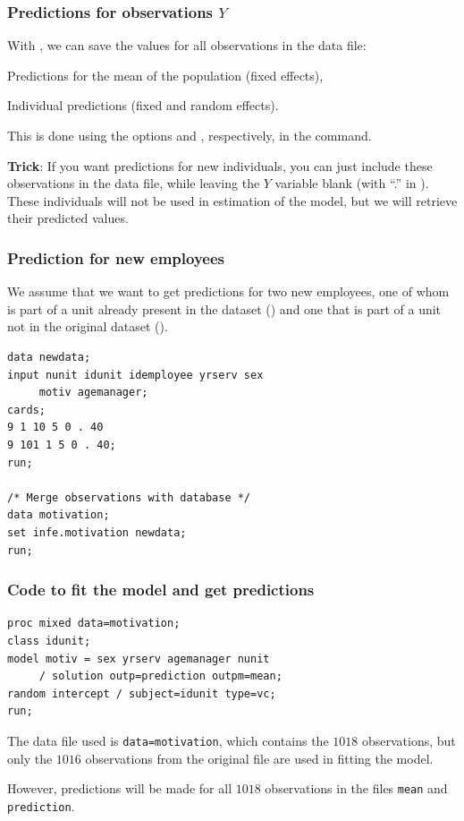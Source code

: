 \documentclass{beamer}
\begin{document}
\begin{frame}[fragile]
\frametitle{Predictions for observations $Y$}
\bi
\item With , we can save the values \alert{for all observations in the data file}:
\bi
\item Predictions for the mean of the population (fixed effects),
\item Individual predictions (fixed and random effects).
\ei
\item This is done using the options 
and , respectively, in the  command.
\item \textbf{Trick}: If you want predictions for new individuals, you can just include these observations in the data file, while leaving the $Y$ variable blank (with ``.'' in \SASlang{}). These individuals will not be used in estimation of the model, but we will retrieve their predicted values.
\ei
\end{frame}

\begin{frame}[fragile]
\frametitle{Prediction for new employees}
We assume that we want to get predictions for two new employees, one of whom is part of a unit already present in the dataset () and one that is part of a unit not in the original dataset (). 


\begin{tcolorbox}[colback=white, colframe=hecblue, title=\SASlang{} code to input two new observations]
\begin{small}
\begin{verbatim}
data newdata; 
input nunit idunit idemployee yrserv sex 
     motiv agemanager; 
cards; 
9 1 10 5 0 . 40 
9 101 1 5 0 . 40; 
run; 

/* Merge observations with database */
data motivation; 
set infe.motivation newdata; 
run;
\end{verbatim}
\end{small}
\end{tcolorbox}
\end{frame}

\begin{frame}[fragile]
\frametitle{Code to fit the model and get predictions}
\begin{tcolorbox}[colback=white, colframe=hecblue, title=\SASlang{} code to output predictions from a mixed model]
\begin{verbatim}
proc mixed data=motivation; 
class idunit; 
model motiv = sex yrserv agemanager nunit 
     / solution outp=prediction outpm=mean; 
random intercept / subject=idunit type=vc; 
run;
\end{verbatim}
\end{tcolorbox}
\bi
\item The data file used is \texttt{data=motivation}, which contains the $1018$ observations, but only the $1016$ observations from the original file are used in fitting the model. 
\item However, predictions will be made for all $1018$ observations in the files \texttt{mean} and \texttt{prediction}.
\ei
\end{frame}
\end{document}
